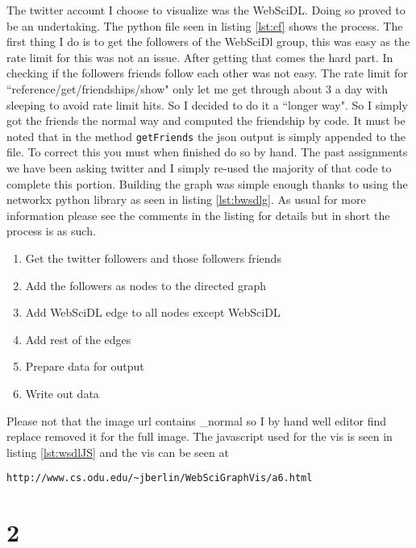 \documentclass[letterpaper,10pt]{article}
\begin{document}
The twitter account I choose to visualize was the WebSciDL. Doing so proved to be an undertaking. The python file seen in listing \ref{lst:cf} shows the process. The first thing I do is to get the followers of the WebSciDl group, this was easy as the rate limit for this was not an issue. After getting that comes the hard part.
\newline
\newline
In checking if the followers friends follow each other was not easy. The rate limit for ``reference/get/friendships/show" only let me get through about 3 a day with sleeping to avoid rate limit hits. So I decided to do it a ``longer way". 
So I simply got the friends the normal way and computed the friendship by code. It must be noted that in the method \verb+getFriends+ the json output is simply appended to the file. To correct this you must when finished do so by hand. 
The past assignments we have been asking twitter and I simply re-used the majority of that code to complete this portion.
\newline
\newline
Building the graph was simple enough thanks to using the networkx python library as seen in listing \ref{lst:bwsdlg}.
As usual for more information please see the comments in the listing for details but in short the process is as such.
\begin{enumerate}
\item Get the twitter followers and those followers friends
\item Add the followers as nodes to the directed graph
\item Add WebSciDL edge to all nodes except WebSciDL
\item Add rest of the edges
\item Prepare data for output
\item Write out data
\end{enumerate}
Please not that the image url contains \_normal so I by hand well editor find replace removed it for the full image.
\newline
\newline
The javascript used for the vis is seen in listing \ref{lst:wsdlJS} and the vis can be seen at 
\begin{verbatim}
http://www.cs.odu.edu/~jberlin/WebSciGraphVis/a6.html
\end{verbatim}

\newpage
\section*{2}
\end{document}
